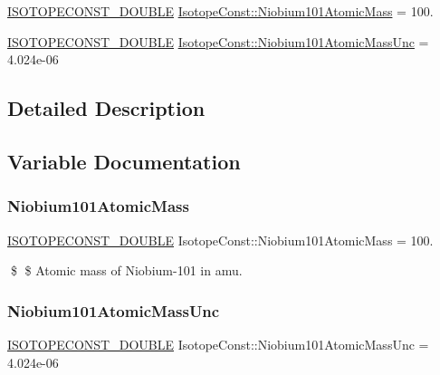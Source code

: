 \begin{DoxyCompactItemize}
\item 
\mbox{\hyperlink{group___isotope_const-_macros_ga8f45a7272ce02c0b4c65c44636ed719a}{I\+S\+O\+T\+O\+P\+E\+C\+O\+N\+S\+T\+\_\+\+D\+O\+U\+B\+LE}} \mbox{\hyperlink{group___isotope_const-_niobium-_nb101_ga8417cdde9e870973a9d60a5c030ceb4b}{Isotope\+Const\+::\+Niobium101\+Atomic\+Mass}} = 100.
\item 
\mbox{\hyperlink{group___isotope_const-_macros_ga8f45a7272ce02c0b4c65c44636ed719a}{I\+S\+O\+T\+O\+P\+E\+C\+O\+N\+S\+T\+\_\+\+D\+O\+U\+B\+LE}} \mbox{\hyperlink{group___isotope_const-_niobium-_nb101_gabcd97cb39ad6b9522aac8e775761c2fd}{Isotope\+Const\+::\+Niobium101\+Atomic\+Mass\+Unc}} = 4.\+024e-\/06
\end{DoxyCompactItemize}


\subsection{Detailed Description}


\subsection{Variable Documentation}
\mbox{\label{group___isotope_const-_niobium-_nb101_ga8417cdde9e870973a9d60a5c030ceb4b}} 
\subsubsection{\texorpdfstring{Niobium101\+Atomic\+Mass}{Niobium101AtomicMass}}
{\footnotesize\ttfamily \mbox{\hyperlink{group___isotope_const-_macros_ga8f45a7272ce02c0b4c65c44636ed719a}{I\+S\+O\+T\+O\+P\+E\+C\+O\+N\+S\+T\+\_\+\+D\+O\+U\+B\+LE}} Isotope\+Const\+::\+Niobium101\+Atomic\+Mass = 100.}

\$ \$ Atomic mass of Niobium-\/101 in amu. \mbox{\label{group___isotope_const-_niobium-_nb101_gabcd97cb39ad6b9522aac8e775761c2fd}} 
\subsubsection{\texorpdfstring{Niobium101\+Atomic\+Mass\+Unc}{Niobium101AtomicMassUnc}}
{\footnotesize\ttfamily \mbox{\hyperlink{group___isotope_const-_macros_ga8f45a7272ce02c0b4c65c44636ed719a}{I\+S\+O\+T\+O\+P\+E\+C\+O\+N\+S\+T\+\_\+\+D\+O\+U\+B\+LE}} Isotope\+Const\+::\+Niobium101\+Atomic\+Mass\+Unc = 4.\+024e-\/06}

